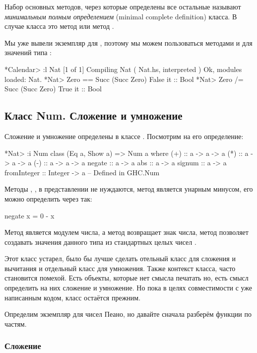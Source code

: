 Набор основных методов, через которые определены все остальные называют
\emph{минимальным полным определением} (minimal complete definition)
класса. В случае класса  это метод \In{==} или метод \In{/=}.

Мы уже вывели экземпляр для , поэтому мы можем пользоваться
методами \In{==} и \In{/=} для значений типа :


\begin{code}
*Calendar> :l Nat
[1 of 1] Compiling Nat              ( Nat.hs, interpreted )
Ok, modules loaded: Nat.
*Nat> Zero == Succ (Succ Zero)
False
it :: Bool
*Nat> Zero /= Succ (Succ Zero)
True
it :: Bool
\end{code}

\subsection{Класс Num. Сложение и умножение}

Сложение и умножение определены в классе . Посмотрим на его
определение:


\begin{code}
*Nat> :i Num
class (Eq a, Show a) => Num a where
  (+) :: a -> a -> a
  (*) :: a -> a -> a
  (-) :: a -> a -> a
  negate :: a -> a
  abs :: a -> a
  signum :: a -> a
  fromInteger :: Integer -> a
  	-- Defined in GHC.Num
\end{code}

Методы \In{(+)}, \In{(*)}, \In{(-)} в представлении не нуждаются, метод
 является унарным минусом, его можно определить через
\In{(-)} так:


\begin{code}
negate x = 0 - x
\end{code}

Метод  является модулем числа, а метод  возвращает
знак числа, метод  позволяет создавать значения данного
типа из стандартных целых чисел .

Этот класс устарел, было бы лучше сделать отельный класс для сложения и
вычитания и отдельный класс для умножения. Также контекст класса, часто
становится помехой. Есть объекты, которые нет смысла печатать но, есть
смысл определить на них сложение и умножение. Но пока в целях
совместимости с уже написанным кодом, класс  остаётся прежним.

Определим экземпляр для чисел Пеано, но давайте сначала разберём функции
по частям.

\subsubsection{Сложение}

